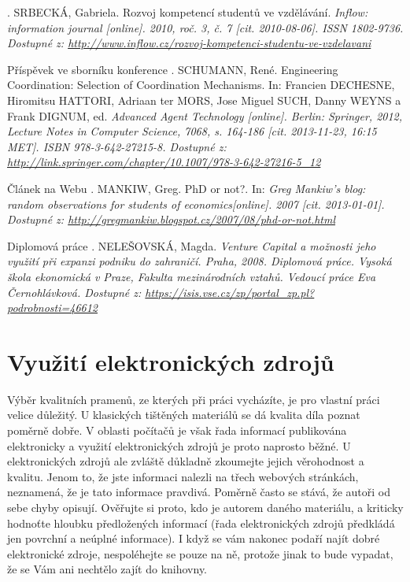 . SRBECKÁ, Gabriela. Rozvoj kompetencí studentů ve vzdělávání. \it Inflow: information journal \rm [online]. 2010, roč. 3, č. 7 [cit. 2010-08-06]. ISSN 1802-9736. Dostupné z: \url{http://www.inflow.cz/rozvoj-kompetenci-studentu-ve-vzdelavani}

\bigskip
\noindent Příspěvek ve sborníku konference . SCHUMANN, René. Engineering Coordination: Selection of Coordination Mechanisms. In: Francien DECHESNE, Hiromitsu HATTORI, Adriaan ter MORS, Jose Miguel SUCH, Danny WEYNS a Frank DIGNUM, ed. \it Advanced Agent Technology \rm [online]. Berlin: Springer, 2012, Lecture Notes in Computer Science, 7068, s. 164-186 [cit. 2013-11-23, 16:15 MET]. ISBN 978-3-642-27215-8. Dostupné z: \url{http://link.springer.com/chapter/10.1007/978-3-642-27216-5\_12}

\bigskip
\noindent Článek na Webu . MANKIW, Greg. PhD or not?. In: \it Greg Mankiw's blog: random observations for students of economics\rm  [online]. 2007 [cit. 2013-01-01]. Dostupné z: \url{http://gregmankiw.blogspot.cz/2007/08/phd-or-not.html}

\bigskip
\noindent Diplomová práce . NELEŠOVSKÁ, Magda. \it Venture Capital a možnosti jeho využití při expanzi podniku do zahraničí\rm . Praha, 2008. Diplomová práce. Vysoká škola ekonomická v Praze, Fakulta mezinárodních vztahů. Vedoucí práce Eva Černohlávková. Dostupné z: \url{https://isis.vse.cz/zp/portal\_zp.pl?podrobnosti=46612}

\section{Využití elektronických zdrojů}

Výběr kvalitních pramenů, ze kterých při práci vycházíte, je pro vlastní práci velice důležitý. U klasických tištěných materiálů se dá kvalita díla poznat poměrně dobře. V oblasti počítačů je však řada informací publikována elektronicky a využití elektronických zdrojů je proto naprosto běžné. U elektronických zdrojů ale zvláště důkladně zkoumejte jejich věrohodnost a kvalitu. Jenom to, že jste informaci nalezli na třech webových stránkách, neznamená, že je tato informace pravdivá. Poměrně často se stává, že autoři od sebe chyby opisují. Ověřujte si proto, kdo je autorem daného materiálu, a kriticky hodnoťte hloubku předložených informací (řada elektronických zdrojů předkládá jen povrchní a neúplné informace). I když se vám nakonec podaří najít dobré elektronické zdroje, nespoléhejte se pouze na ně, protože jinak to bude vypadat, že se Vám ani nechtělo zajít do knihovny.

